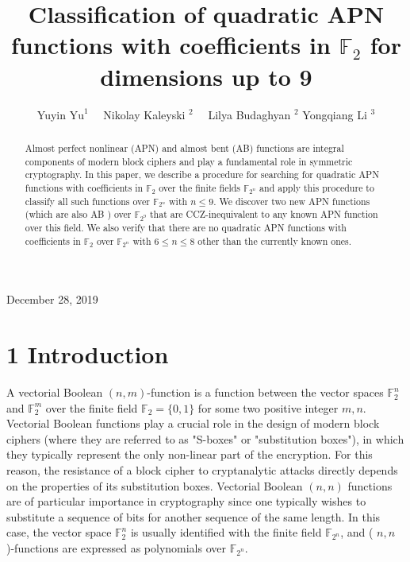 \documentclass[10pt]{article}
\title{Classification of quadratic APN functions with coefficients in $\mathbb{F}_{2}$ for dimensions up to 9 }
\author{Yuyin $\mathrm{Yu}^{1} \quad$ Nikolay Kaleyski ${ }^{2} \quad$ Lilya Budaghyan ${ }^{2}$ Yongqiang Li ${ }^{3}$}
\date{}
\begin{document}
\maketitle
\captionsetup{singlelinecheck=false}
December 28, 2019

\begin{abstract}
Almost perfect nonlinear (APN) and almost bent (AB) functions are integral components of modern block ciphers and play a fundamental role in symmetric cryptography. In this paper, we describe a procedure for searching for quadratic APN functions with coefficients in $\mathbb{F}_{2}$ over the finite fields $\mathbb{F}_{2^{n}}$ and apply this procedure to classify all such functions over $\mathbb{F}_{2^{n}}$ with $n \leq 9$. We discover two new APN functions (which are also AB ) over $\mathbb{F}_{2^{9}}$ that are CCZ-inequivalent to any known APN function over this field. We also verify that there are no quadratic APN functions with coefficients in $\mathbb{F}_{2}$ over $\mathbb{F}_{2^{n}}$ with $6 \leq n \leq 8$ other than the currently known ones.
\end{abstract}

\section*{1 Introduction}
A vectorial Boolean $(n, m)$-function is a function between the vector spaces $\mathbb{F}_{2}^{n}$ and $\mathbb{F}_{2}^{m}$ over the finite field $\mathbb{F}_{2}=\{0,1\}$ for some two positive integer $m, n$. Vectorial Boolean functions play a crucial role in the design of modern block ciphers (where they are referred to as "S-boxes" or "substitution boxes"), in which they typically represent the only non-linear part of the encryption. For this reason, the resistance of a block cipher to cryptanalytic attacks directly depends on the properties of its substitution boxes. Vectorial Boolean $(n, n)$ functions are of particular importance in cryptography since one typically wishes to substitute a sequence of bits for another sequence of the same length. In this case, the vector space $\mathbb{F}_{2}^{n}$ is usually identified with the finite field $\mathbb{F}_{2^{n}}$, and ( $n, n$ )-functions are expressed as polynomials over $\mathbb{F}_{2^{n}}$.
\end{document}
